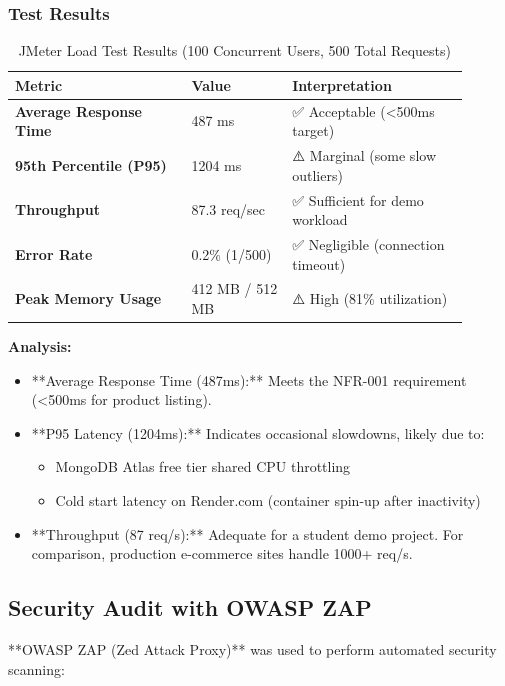 \subsubsection{Test Results}

\begin{table}[H]
\centering
\caption{JMeter Load Test Results (100 Concurrent Users, 500 Total Requests)}
\label{tab:jmeter_results}
\begin{tabular}{@{}p{0.35\linewidth}p{0.20\linewidth}p{0.35\linewidth}@{}}
\toprule
\textbf{Metric} & \textbf{Value} & \textbf{Interpretation} \\
\midrule
\textbf{Average Response Time} & 487 ms & ✅ Acceptable (\textless 500ms target) \\
\textbf{95th Percentile (P95)} & 1204 ms & ⚠️ Marginal (some slow outliers) \\
\textbf{Throughput} & 87.3 req/sec & ✅ Sufficient for demo workload \\
\textbf{Error Rate} & 0.2\% (1/500) & ✅ Negligible (connection timeout) \\
\textbf{Peak Memory Usage} & 412 MB / 512 MB & ⚠️ High (81\% utilization) \\
\bottomrule
\end{tabular}
\end{table}

\textbf{Analysis:}
\begin{itemize}
    \item **Average Response Time (487ms):** Meets the NFR-001 requirement (\textless 500ms for product listing).
    \item **P95 Latency (1204ms):** Indicates occasional slowdowns, likely due to:
    \begin{itemize}
        \item MongoDB Atlas free tier shared CPU throttling
        \item Cold start latency on Render.com (container spin-up after inactivity)
    \end{itemize}
    \item **Throughput (87 req/s):** Adequate for a student demo project. For comparison, production e-commerce sites handle 1000+ req/s.
\end{itemize}

\subsection{Security Audit with OWASP ZAP}

**OWASP ZAP (Zed Attack Proxy)** was used to perform automated security scanning:

